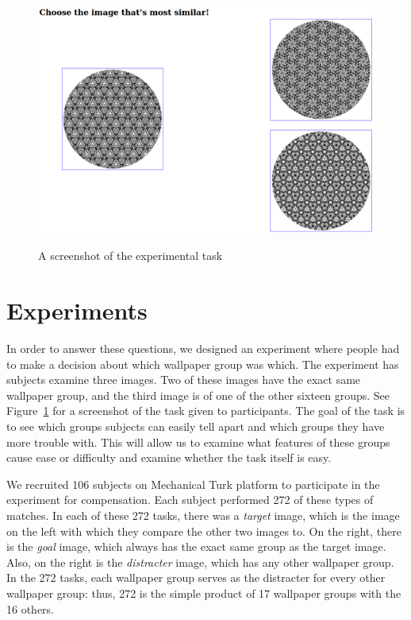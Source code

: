 \begin{figure}[!ht]
\centering
\includegraphics[width=0.9\columnwidth]{symper}
\label{screenshot}
\caption{A screenshot of the experimental task}
\end{figure}


\section{Experiments}
In order to answer these questions, we designed an experiment where people had to make a decision about which wallpaper group was which. The experiment has subjects examine three images. Two of these images have the exact same wallpaper group, and the third image is of one of the other sixteen groups. See Figure~\ref{screenshot} for a screenshot of the task given to participants. The goal of the task is to see which groups subjects can easily tell apart and which groups they have more trouble with. This will allow us to examine what features of these groups cause ease or difficulty and examine whether the task itself is easy.

We recruited 106 subjects on Mechanical Turk platform to participate in the experiment for compensation. Each subject performed 272 of these types of matches. In each of these 272 tasks, there was a \textit{target} image, which is the image on the left with which they compare the other two images to. On the right, there is the \textit{goal} image, which always has the exact same group as the target image. Also, on the right is the \textit{distracter} image, which has any other wallpaper group. In the 272 tasks, each wallpaper group serves as the distracter for every other wallpaper group: thus, 272 is the simple product of 17 wallpaper groups with the 16 others.

